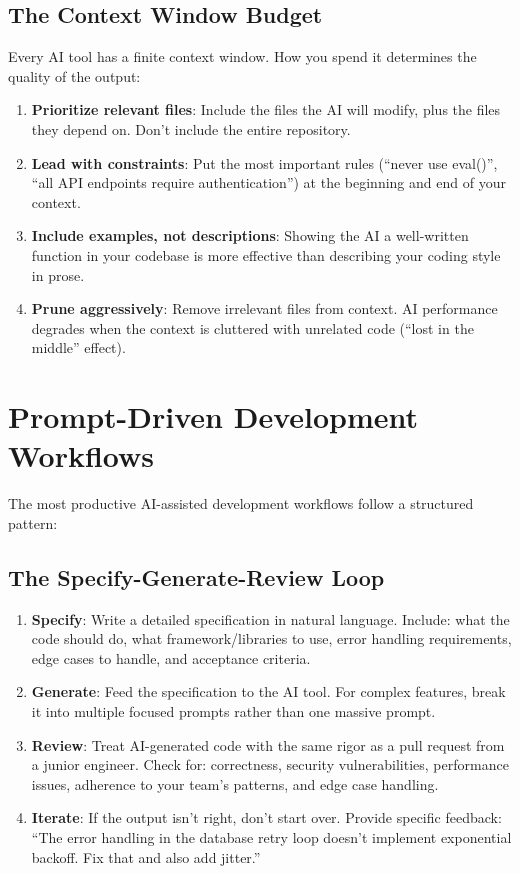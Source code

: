 \subsection{The Context Window Budget}

Every AI tool has a finite context window. How you spend it determines the quality of the output:

\begin{enumerate}[leftmargin=*]
    \item \textbf{Prioritize relevant files}: Include the files the AI will modify, plus the files they depend on. Don't include the entire repository.
    \item \textbf{Lead with constraints}: Put the most important rules (``never use eval()'', ``all API endpoints require authentication'') at the beginning and end of your context.
    \item \textbf{Include examples, not descriptions}: Showing the AI a well-written function in your codebase is more effective than describing your coding style in prose.
    \item \textbf{Prune aggressively}: Remove irrelevant files from context. AI performance degrades when the context is cluttered with unrelated code (``lost in the middle'' effect).
\end{enumerate}

\section{Prompt-Driven Development Workflows}

The most productive AI-assisted development workflows follow a structured pattern:

\subsection{The Specify-Generate-Review Loop}

\begin{enumerate}[leftmargin=*]
    \item \textbf{Specify}: Write a detailed specification in natural language. Include: what the code should do, what framework/libraries to use, error handling requirements, edge cases to handle, and acceptance criteria.
    \item \textbf{Generate}: Feed the specification to the AI tool. For complex features, break it into multiple focused prompts rather than one massive prompt.
    \item \textbf{Review}: Treat AI-generated code with the same rigor as a pull request from a junior engineer. Check for: correctness, security vulnerabilities, performance issues, adherence to your team's patterns, and edge case handling.
    \item \textbf{Iterate}: If the output isn't right, don't start over. Provide specific feedback: ``The error handling in the database retry loop doesn't implement exponential backoff. Fix that and also add jitter.''
\end{enumerate}

